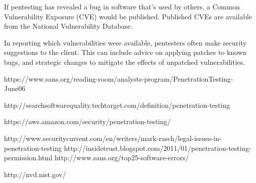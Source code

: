 \documentclass{report}
\begin{document}
If pentesting has revealed a bug in software that's used by others, a Common
Vulnerability Exposure (CVE) would be published. Published CVEs are available
from the National Vulnerability Database\cite{nvd}. 

In reporting which vulnerabilities were available, pentesters often make
security suggestions to the client. This can include advice on applying
patches to known bugs, and strategic changes to mitigate the effects of
unpatched vulnerabilities. 

\newpage
\begin{thebibliography}{1}
     https://www.sans.org/reading-room/analysts-program/PenetrationTesting-June06

        http://searchsoftwarequality.techtarget.com/definition/penetration-testing

     https://aws.amazon.com/security/penetration-testing/

        http://www.securitycurrent.com/en/writers/mark-rasch/legal-issues-in-penetration-testing
     http://insidetrust.blogspot.com/2011/01/penetration-testing-permission.html
        http://www.sans.org/top25-software-errors/

     http://nvd.nist.gov/
\end{thebibliography}
\end{document}
